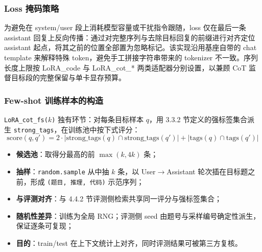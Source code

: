 \subsubsection{Loss 掩码策略}
为避免在 system/user 段上消耗模型容量或干扰指令跟随，loss 仅在最后一条 assistant 回复上反向传播：通过对完整序列与去除目标回复的前缀进行对齐定位 assistant 起点，将其之前的位置全部置为忽略标记。该实现沿用基座自带的 chat template 来解释特殊 token，避免手工拼接字符串带来的 tokenizer 不一致。序列长度上限按 LoRA\_code 与 LoRA\_cot\_* 两类适配器分别设置，以兼顾 CoT 监督目标段的完整保留与单卡显存预算。

\subsubsection{Few-shot 训练样本的构造}
\texttt{LoRA\_cot\_fs($k$)} 独有环节：对每条目标样本 $q$，用 3.3.2 节定义的强标签集合派生 \texttt{strong\_tags}，在训练池中按下式评分：
\[
\text{score}(q, q') = 2\cdot |\mathrm{strong\_tags}(q) \cap \mathrm{strong\_tags}(q')| + |\mathrm{tags}(q) \cap \mathrm{tags}(q')|
\]
\begin{itemize}
    \item \textbf{候选池}：取得分最高的前 $\max(k, 4k)$ 条；
    \item \textbf{抽样}：\texttt{random.sample} 从中抽 $k$ 条，以 User$\rightarrow$Assistant 轮次插在目标题之前，形成 \texttt{(题目, 推理, 代码)} 示范序列；
    \item \textbf{与评测对齐}：与 4.4.2 节评测侧检索共享同一评分与强标签集合；
    \item \textbf{随机性差异}：训练为全局 RNG；评测侧 seed 由题号与采样编号确定性派生，保证逐条可复现；
    \item \textbf{目的}：train/test 在上下文统计上对齐，同时评测结果可被第三方复核。
\end{itemize}